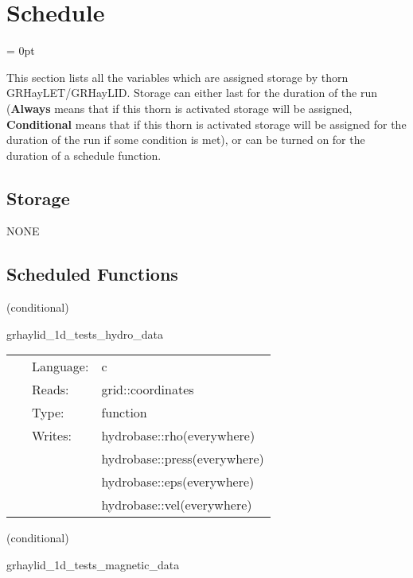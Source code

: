 
\section{Schedule} 


\parskip = 0pt


\noindent This section lists all the variables which are assigned storage by thorn GRHayLET/GRHayLID.  Storage can either last for the duration of the run ({\bf Always} means that if this thorn is activated storage will be assigned, {\bf Conditional} means that if this thorn is activated storage will be assigned for the duration of the run if some condition is met), or can be turned on for the duration of a schedule function.


\subsection*{Storage}NONE
\subsection*{Scheduled Functions}
\vspace{5mm}

   (conditional) 

\hspace{5mm} grhaylid\_1d\_tests\_hydro\_data 

\hspace{5mm}{\it set initial hydrodynamic data for 1d test } 


\hspace{5mm}

 \begin{tabular*}{160mm}{cll} 
~ & Language:  & c \\ 
~ & Reads:  & grid::coordinates \\ 
~ & Type:  & function \\ 
~ & Writes:  & hydrobase::rho(everywhere) \\ 
~& ~ &hydrobase::press(everywhere)\\ 
~& ~ &hydrobase::eps(everywhere)\\ 
~& ~ &hydrobase::vel(everywhere)\\ 
\end{tabular*} 


\vspace{5mm}

   (conditional) 

\hspace{5mm} grhaylid\_1d\_tests\_magnetic\_data 

